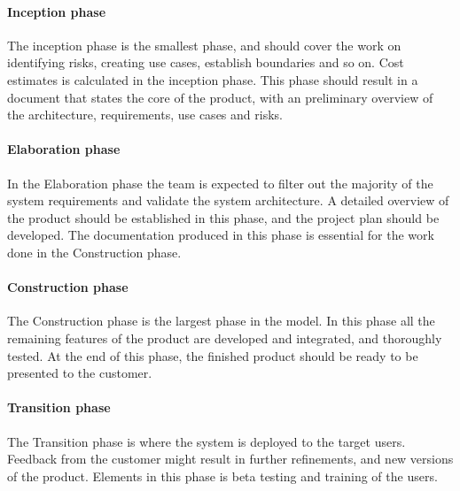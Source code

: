\paragraph{Inception phase} The inception phase is the smallest phase, and should cover the work on identifying risks, creating use cases, establish boundaries and so on. Cost estimates is calculated in the inception phase. This phase should result in a document that states the core of the product, with an preliminary overview of the architecture, requirements, use cases and risks.

\paragraph{Elaboration phase} In the Elaboration phase the team is expected to filter out the majority of the system requirements and validate the system architecture. A detailed overview of the product should be established in this phase, and the project plan should be developed. The documentation produced in this phase is essential for the work done in the Construction phase.

\paragraph{Construction phase} The Construction phase is the largest phase in the model. In this phase all the remaining features of the product are developed and integrated, and thoroughly tested. At the end of this phase, the finished product should be ready to be presented to the customer.

\paragraph{Transition phase} The Transition phase is where the system is deployed to the target users. Feedback from the customer might result in further refinements, and new versions of the product. Elements in this phase is beta testing and training of the users.


